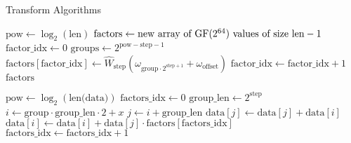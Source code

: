 \begin{algorithm}
    \caption{Transform Algorithms}
    \begin{algorithmic}
            \State $\text{pow} \gets \log_2(\text{len})$
            \State $\text{factors} \gets \text{new array of $\text{GF}(2^{64})$ values of size } \text{len} - 1$
            \State $\text{factor\_idx} \gets 0$
                \State $\text{groups} \gets 2^{\text{pow} - \text{step} - 1}$
                    \State $\text{factors}[\text{factor\_idx}] \gets \hat{W}_{\text{step}}(\omega_{\text{group} \cdot 2^{\text{step} + 1}} + \omega_{\text{offset}})$
                    \State $\text{factor\_idx} \gets \text{factor\_idx} + 1$
                \EndFor
            \EndFor
            \State \Return $\text{factors}$
        \EndFunction
    \end{algorithmic}

    \begin{algorithmic}
            \State $\text{pow} \gets \log_2(\text{len(data)})$
            \State $\text{factors\_idx} \gets 0$
                \State $\text{group\_len} \gets 2^{\text{step}}$
                        \State $i \gets \text{group} \cdot \text{group\_len} \cdot 2 + x$
                        \State $j \gets i + \text{group\_len}$
                        \State $\text{data}[j] \gets \text{data}[j] + \text{data}[i]$
                        \State $\text{data}[i] \gets \text{data}[i] + \text{data}[j] \cdot \text{factors}[\text{factors\_idx}]$
                    \EndFor
                    \State $\text{factors\_idx} \gets \text{factors\_idx} + 1$
                \EndFor
            \EndFor
        \EndFunction
    \end{algorithmic}


\end{algorithm}
